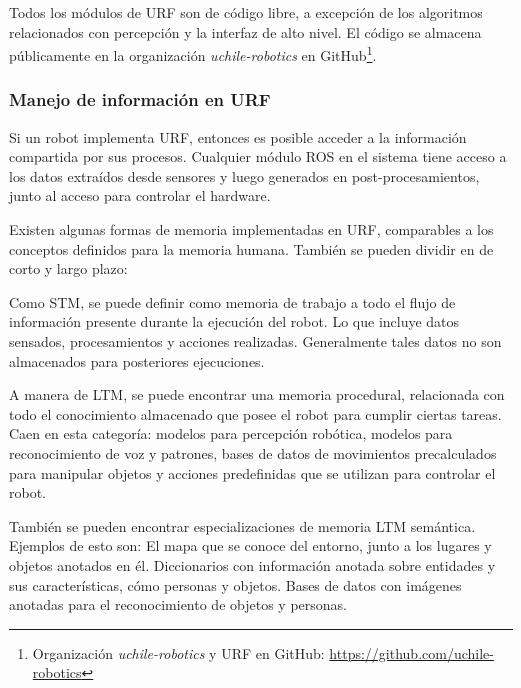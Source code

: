 Todos los módulos de URF son de código libre, a excepción de los algoritmos relacionados con percepción y la interfaz de alto nivel. El código se almacena públicamente en la organización \textit{uchile-robotics} en GitHub\footnote{Organización \textit{uchile-robotics} y URF en GitHub: \url{https://github.com/uchile-robotics}}.




\subsubsection{Manejo de información en URF}

Si un robot implementa URF, entonces es posible acceder a la información compartida por sus procesos. Cualquier módulo ROS en el sistema tiene acceso a los datos extraídos desde sensores y luego generados en post-procesamientos, junto al acceso para controlar el hardware.

Existen algunas formas de memoria implementadas en URF, comparables a los conceptos definidos para la memoria humana. También se pueden dividir en de corto y largo plazo:

Como STM, se puede definir como memoria de trabajo a todo el flujo de información presente durante la ejecución del robot. Lo que incluye datos sensados, procesamientos y acciones realizadas. Generalmente tales datos no son almacenados para posteriores ejecuciones.

A manera de LTM, se puede encontrar una memoria procedural, relacionada con todo el conocimiento almacenado que posee el robot para cumplir ciertas tareas. Caen en esta categoría: modelos para percepción robótica, modelos para reconocimiento de voz y patrones, bases de datos de movimientos precalculados para manipular objetos y acciones predefinidas que se utilizan para controlar el robot.

También se pueden encontrar especializaciones de memoria LTM semántica. Ejemplos de esto son: El mapa que se conoce del entorno, junto a los lugares y objetos anotados en él. Diccionarios con información anotada sobre entidades y sus características, cómo personas y objetos. Bases de datos con imágenes anotadas para el reconocimiento de objetos y personas. 


